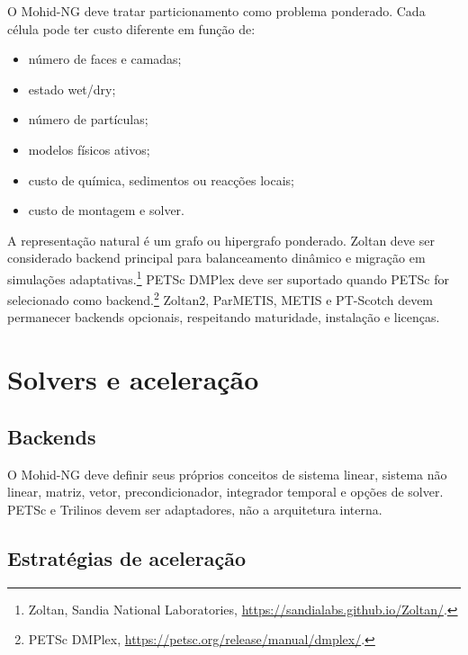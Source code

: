 \documentclass[11pt,a4paper]{article}
\begin{document}
O Mohid-NG deve tratar particionamento como problema ponderado. Cada c\'elula pode ter custo diferente em fun\c{c}\~ao de:
\begin{itemize}
  \item n\'umero de faces e camadas;
  \item estado wet/dry;
  \item n\'umero de part\'iculas;
  \item modelos f\'isicos ativos;
  \item custo de qu\'imica, sedimentos ou reac\c{c}\~oes locais;
  \item custo de montagem e solver.
\end{itemize}

A representa\c{c}\~ao natural \'e um grafo ou hipergrafo ponderado. Zoltan deve ser considerado backend principal para balanceamento din\^amico e migra\c{c}\~ao em simula\c{c}\~oes adaptativas.\footnote{Zoltan, Sandia National Laboratories, \url{https://sandialabs.github.io/Zoltan/}.} PETSc DMPlex deve ser suportado quando PETSc for selecionado como backend.\footnote{PETSc DMPlex, \url{https://petsc.org/release/manual/dmplex/}.} Zoltan2, ParMETIS, METIS e PT-Scotch devem permanecer backends opcionais, respeitando maturidade, instala\c{c}\~ao e licen\c{c}as.

\section{Solvers e acelera\c{c}\~ao}

\subsection{Backends}

O Mohid-NG deve definir seus pr\'oprios conceitos de sistema linear, sistema n\~ao linear, matriz, vetor, precondicionador, integrador temporal e op\c{c}\~oes de solver. PETSc e Trilinos devem ser adaptadores, n\~ao a arquitetura interna.

\subsection{Estrat\'egias de acelera\c{c}\~ao}
\end{document}
